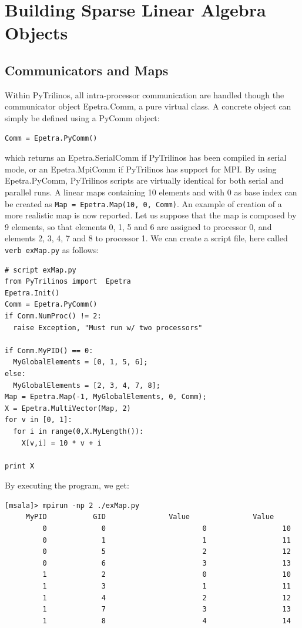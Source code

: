 \documentclass[10pt,relax]{SANDreport}
\begin{document}
\section{Building Sparse Linear Algebra Objects}
\label{sec:building}

\subsection{Communicators and Maps}
\label{sec:communicators}

Within PyTrilinos, all intra-processor communication are handled though the
communicator object Epetra.Comm, a pure virtual class. A concrete object can
simply be defined using a PyComm object:
\begin{verbatim}
Comm = Epetra.PyComm()
\end{verbatim}
which returns an Epetra.SerialComm if PyTrilinos has been compiled in serial
mode, or an Epetra.MpiComm if PyTrilinos has support for MPI. By using
Epetra.PyComm, PyTrilinos scripts are virtually identical for both serial and
parallel runs.
 A linear maps containing 10
elements and with 0 as base index can be created as 
\verb!Map = Epetra.Map(10, 0, Comm)!. An example of creation of a more
realistic map is now reported. Let us suppose that the map is 
composed by 9 elements, so that elements 0, 1, 5 and 6
are assigned to processor 0, and elements 2, 3, 4, 7 and 8 to processor 1. We
can create a script file, here called {\tt verb exMap.py} as follows:
\begin{verbatim}
# script exMap.py
from PyTrilinos import  Epetra
Epetra.Init()
Comm = Epetra.PyComm()
if Comm.NumProc() != 2:
  raise Exception, "Must run w/ two processors"

if Comm.MyPID() == 0:
  MyGlobalElements = [0, 1, 5, 6];
else:
  MyGlobalElements = [2, 3, 4, 7, 8];
Map = Epetra.Map(-1, MyGlobalElements, 0, Comm);
X = Epetra.MultiVector(Map, 2)
for v in [0, 1]:
  for i in range(0,X.MyLength()):
    X[v,i] = 10 * v + i

print X
\end{verbatim}
By executing the program, we get:
\begin{verbatim}
[msala]> mpirun -np 2 ./exMap.py
     MyPID           GID               Value               Value  
         0             0                       0                  10
         0             1                       1                  11
         0             5                       2                  12
         0             6                       3                  13
         1             2                       0                  10
         1             3                       1                  11
         1             4                       2                  12
         1             7                       3                  13
         1             8                       4                  14
\end{verbatim}
\end{document}

